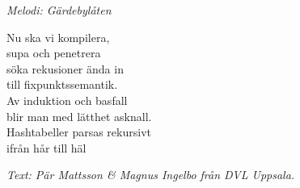       {\footnotesize\textit{Melodi: Gärdebylåten}}\par
\vspace{10pt}
Nu ska vi kompilera,\\
supa och penetrera\\
söka rekusioner ända in\\
till fixpunktssemantik.\\
Av induktion och basfall\\
blir man med lätthet asknall.\\
Hashtabeller parsas rekursivt\\
ifrån hår till häl\par
\vspace{10pt}
{\footnotesize\textit{Text: Pär Mattsson \& Magnus Ingelbo från DVL Uppsala.}}
